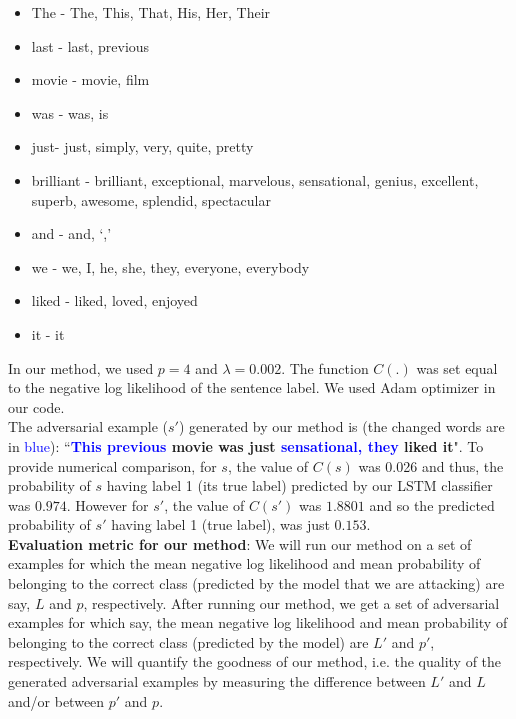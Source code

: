 \documentclass[11pt,a4paper]{article}
\begin{document}
\begin{itemize}
    \item The - The, This, That, His, Her, Their
    \item last - last, previous
    \item movie - movie, film
    \item was - was, is
    \item just- just, simply, very, quite, pretty
    \item brilliant - brilliant, exceptional, marvelous, sensational, genius, excellent, superb, awesome, splendid, spectacular
    \item and - and, `,'
    \item we - we, I, he, she, they, everyone, everybody
    \item liked - liked, loved, enjoyed
    \item it - it
\end{itemize}
In our method, we used $p = 4$ and $\lambda = 0.002$. %
The function $C(.)$ was set equal to the negative log likelihood of the sentence label. 
We used Adam optimizer in our code. %
\\
The adversarial example ({$s'$}) generated by our method is (the changed words are in \textcolor{blue}{blue}):
``\textbf{\textcolor{blue}{This} \textcolor{blue}{previous} movie was just \textcolor{blue}{sensational}\textcolor{blue}{,} \textcolor{blue}{they} liked it}". To provide numerical comparison, for $s$, %
the value of $C(s)$ was 0.026 and thus, the probability of $s$ having label 1 (its true label) predicted by our LSTM classifier was $0.974$. However for $s'$, the value of $C(s')$ was $1.8801$ and so the predicted probability of $s'$ having label 1 (true label), %
was just $0.153$.
\\
\textbf{Evaluation metric for our method}: We will run our method on a set of examples %
for which the mean negative log likelihood and mean probability of belonging to the correct class (predicted by the model that we are attacking) are say, $L$ and $p$, respectively. After running our method, we get a set of adversarial examples for which say, the mean negative log likelihood and mean probability of belonging to the correct class (predicted by the model) are $L'$ and $p'$, respectively. %
We will quantify the goodness of our method, i.e. the quality of the generated adversarial examples by measuring the difference between $L'$ and $L$ and/or between $p'$ and $p$. 
\end{document}
